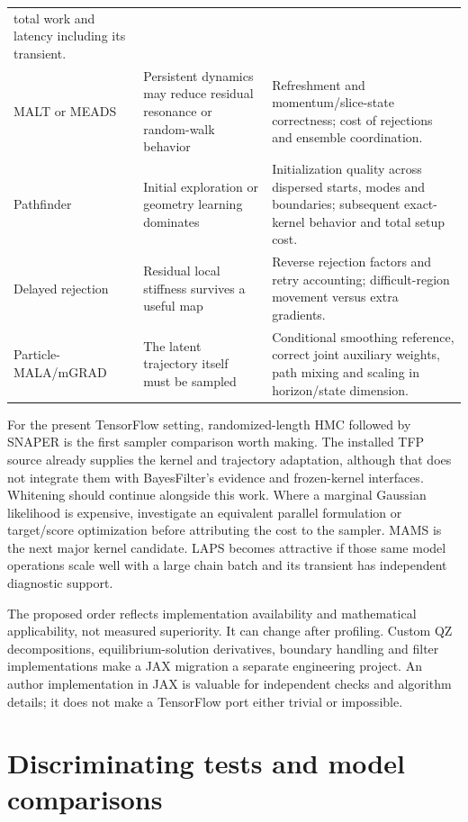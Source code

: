 \begin{longtable}{>{\raggedright\arraybackslash}p{}
>{\raggedright\arraybackslash}p{}
>{\raggedright\arraybackslash}p{}}
total work and latency including its transient.\\
MALT or MEADS &
Persistent dynamics may reduce residual resonance or random-walk behavior &
Refreshment and momentum/slice-state correctness; cost of rejections and
ensemble coordination.\\
Pathfinder &
Initial exploration or geometry learning dominates &
Initialization quality across dispersed starts, modes and boundaries;
subsequent exact-kernel behavior and total setup cost.\\
Delayed rejection &
Residual local stiffness survives a useful map &
Reverse rejection factors and retry accounting; difficult-region movement
versus extra gradients.\\
Particle-MALA/mGRAD &
The latent trajectory itself must be sampled &
Conditional smoothing reference, correct joint auxiliary weights, path
mixing and scaling in horizon/state dimension.\\
\end{longtable}

For the present TensorFlow setting, randomized-length HMC followed by SNAPER
is the first sampler comparison worth making. The installed TFP source
already supplies the kernel and trajectory adaptation, although that does
not integrate them with BayesFilter's evidence and frozen-kernel interfaces.
Whitening should continue alongside this work. Where a marginal Gaussian
likelihood is expensive, investigate an equivalent parallel formulation or
target/score optimization before attributing the cost to the sampler.
MAMS is the next major kernel candidate. LAPS becomes attractive if those
same model operations scale well with a large chain batch and its transient
has independent diagnostic support.

The proposed order reflects implementation availability and mathematical
applicability, not measured superiority. It can change after profiling.
Custom QZ decompositions, equilibrium-solution derivatives, boundary
handling and filter implementations make a JAX migration a separate
engineering project. An author implementation in JAX is valuable for
independent checks and algorithm details; it does not make a TensorFlow
port either trivial or impossible.

\section{Discriminating tests and model comparisons}
\label{sec:bf-modern-tests}

